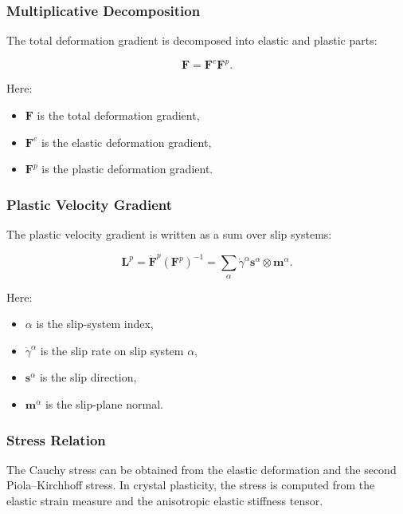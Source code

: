\documentclass[11pt,a4paper]{article}
\begin{document}
\subsubsection{Multiplicative Decomposition}

The total deformation gradient is decomposed into elastic and plastic parts:

\begin{equation}
\bm{F}
=
\bm{F}^e \bm{F}^p .
\end{equation}

Here:

\begin{itemize}
    \item $\bm{F}$ is the total deformation gradient,
    \item $\bm{F}^e$ is the elastic deformation gradient,
    \item $\bm{F}^p$ is the plastic deformation gradient.
\end{itemize}

\subsubsection{Plastic Velocity Gradient}

The plastic velocity gradient is written as a sum over slip systems:

\begin{equation}
\bm{L}^p
=
\dot{\bm{F}}^p(\bm{F}^p)^{-1}
=
\sum_{\alpha}
\dot{\gamma}^{\alpha}
\bm{s}^{\alpha}
\otimes
\bm{m}^{\alpha}.
\end{equation}

Here:

\begin{itemize}
    \item $\alpha$ is the slip-system index,
    \item $\dot{\gamma}^{\alpha}$ is the slip rate on slip system $\alpha$,
    \item $\bm{s}^{\alpha}$ is the slip direction,
    \item $\bm{m}^{\alpha}$ is the slip-plane normal.
\end{itemize}

\subsubsection{Stress Relation}

The Cauchy stress can be obtained from the elastic deformation and the second Piola--Kirchhoff stress. In crystal plasticity, the stress is computed from the elastic strain measure and the anisotropic elastic stiffness tensor.
\end{document}
